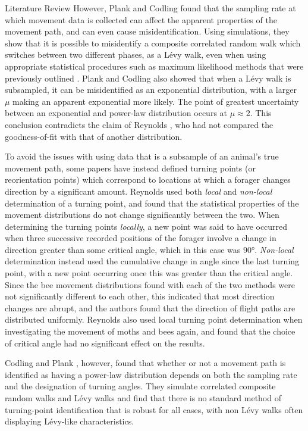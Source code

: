 \begin{section}{Literature Review \label{sec:litreview}}
However, Plank and Codling \cite{Plank_2009} found that the sampling rate at which movement data is collected can affect the apparent properties of the movement path, and can even cause misidentification.
Using simulations, they show that it is possible to misidentify a composite correlated random walk which switches between two different phases, as a L\'{e}vy walk, even when using appropriate statistical procedures such as maximum likelihood methods that were previously outlined \cite{Edwards_2007,Plank_2008,Edwards_2008}.
Plank and Codling \cite{Plank_2009} also showed that when a L\'{e}vy walk is subsampled, it can be misidentified as an exponential distribution, with a larger $\mu$ making an apparent exponential more likely.
The point of greatest uncertainty between an exponential and power-law distribution occurs at $\mu \approx 2$.
This conclusion contradicts the claim of Reynolds \cite{Reynolds_2008_comment}, who had not compared the goodness-of-fit with that of another distribution.

To avoid the issues with using data that is a subsample of an animal's true movement path, some papers have instead defined turning points (or reorientation points) which correspond to locations at which a forager changes direction by a significant amount.
Reynolds \cite{ Reynolds_2007_bees} used both \emph{local} and \emph{non-local} determination of a turning point, and found that the statistical properties of the movement distributions do not change significantly between the two.
When determining the turning points \emph{locally}, a new point was said to have occurred when three successive recorded positions of the forager involve a change in direction greater than some critical angle, which in this case was \ang{90}.
\emph{Non-local} determination instead used the cumulative change in angle since the last turning point, with a new point occurring once this was greater than the critical angle.
Since the bee movement distributions found with each of the two methods were not significantly different to each other, this indicated that most direction changes are abrupt, and the authors found that the direction of flight paths are distributed uniformly.
Reynolds \cite{Reynolds_2007_moths, Reynolds_2009_bees} also used local turning point determination when investigating the movement of moths and bees again, and found that the choice of critical angle had no significant effect on the results. 

Codling and Plank \cite{Codling_2010}, however, found that whether or not a movement path is identified as having a power-law distribution depends on both the sampling rate and the designation of turning angles.
They simulate correlated composite random walks and L\'{e}vy walks and find that there is no standard method of turning-point identification that is robust for all cases, with non L\'{e}vy walks often displaying L\'{e}vy-like characteristics.


\end{section}
